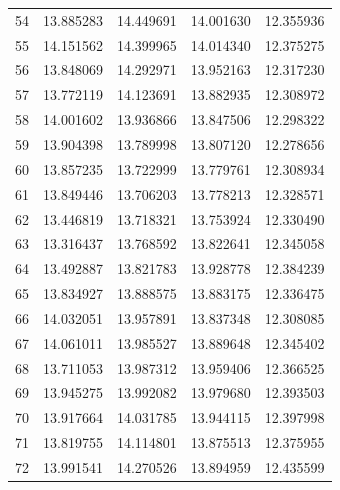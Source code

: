 \begin{table}
\begin{tabular}{rrrrr}
54 & 13.885283 & 14.449691 & 14.001630 & 12.355936 \\
55 & 14.151562 & 14.399965 & 14.014340 & 12.375275 \\
56 & 13.848069 & 14.292971 & 13.952163 & 12.317230 \\
57 & 13.772119 & 14.123691 & 13.882935 & 12.308972 \\
58 & 14.001602 & 13.936866 & 13.847506 & 12.298322 \\
59 & 13.904398 & 13.789998 & 13.807120 & 12.278656 \\
60 & 13.857235 & 13.722999 & 13.779761 & 12.308934 \\
61 & 13.849446 & 13.706203 & 13.778213 & 12.328571 \\
62 & 13.446819 & 13.718321 & 13.753924 & 12.330490 \\
63 & 13.316437 & 13.768592 & 13.822641 & 12.345058 \\
64 & 13.492887 & 13.821783 & 13.928778 & 12.384239 \\
65 & 13.834927 & 13.888575 & 13.883175 & 12.336475 \\
66 & 14.032051 & 13.957891 & 13.837348 & 12.308085 \\
67 & 14.061011 & 13.985527 & 13.889648 & 12.345402 \\
68 & 13.711053 & 13.987312 & 13.959406 & 12.366525 \\
69 & 13.945275 & 13.992082 & 13.979680 & 12.393503 \\
70 & 13.917664 & 14.031785 & 13.944115 & 12.397998 \\
71 & 13.819755 & 14.114801 & 13.875513 & 12.375955 \\
72 & 13.991541 & 14.270526 & 13.894959 & 12.435599 \\
\bottomrule
\end{tabular}
\end{table}
